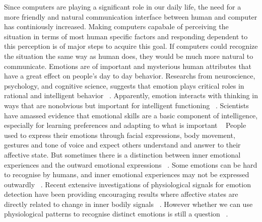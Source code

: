 
Since computers are playing a significant role in our daily
life, the need for a more friendly and natural communication
interface between human and computer has continiously increased. 
Making computers capabale of perceiving the situation in terms 
of most human specific factors and responding
dependent to this perception is of major steps to acquire
this goal. If computers could recognize the situation the
same way as human does, they would be much more natural
to communicate.
Emotions are of important and mysterious human attributes
that have a great effect on people's day to day behavior. Researchs 
from neuroscience, psychology, and cognitive science,
suggests that emotion plays critical roles in rational and intelligent 
behavior ~\cite{picard2001toward}. Apparently, emotion interacts with
thinking in ways that are nonobvious but important for intelligent 
functioning ~\cite{picard2001toward}. Scientists have amassed evidence
that emotional skills are a basic component of intelligence,
especially for learning preferences and adapting to what is
important ~\cite{mayer1993intelligence, goleman2006emotional}
People used to express their emotions through facial expressions, 
body movement, gestures and tone of voice and expect
others understand and answer to their affective state. But
sometimes there is a distinction between inner emotional experiences 
and the outward emotional expressions ~\cite{picard2003affective}. Some
emotions can be hard to recognise by humans, and inner
emotional experiences may not be expressed outwardly ~\cite{jones2007biometric}.
Recent extensive investigations of physiological signals for
emotion detection have been providing encouraging results
where affective states are directly related to change in inner
bodily signals ~\cite{jones2007biometric}. However whether we can use physiological
patterns to recognise distinct emotions is still a 
question ~\cite{picard2001toward, cacioppo1990inferring}.


